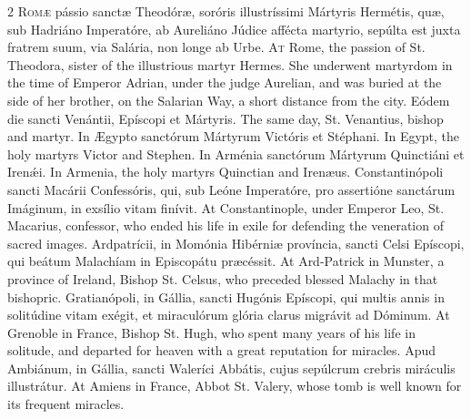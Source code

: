 \begin{paracol}{2}
\lettrine[lines=2]{R}{omæ} pássio sanctæ Theodóræ, soróris 
 illustríssimi Mártyris Hermétis, quæ, sub Hadriáno Imperatóre, ab Aureliáno 
 Júdice affécta martyrio, sepúlta est juxta fratrem suum, via Salária, non 
 longe ab Urbe.
\switchcolumn
{}
\lettrine[lines=2]{A}{t} Rome, the passion of St. Theodora, sister of the illustrious martyr 
 Hermes. She underwent martyrdom in the time of Emperor Adrian, under 
 the judge Aurelian, and was buried at the side of her brother, on the 
 Salarian Way, a short distance from the city.
\switchcolumn*
{}
Eódem die sancti Venántii, Epíscopi et Mártyris.
\switchcolumn
{}
The same day, St. Venantius, bishop and martyr.
\switchcolumn*
{}
In Ægypto sanctórum Mártyrum Victóris et 
 Stéphani.
\switchcolumn
{}
In Egypt, the holy martyrs Victor and Stephen.
\switchcolumn*
{}
In Arménia sanctórum Mártyrum Quinctiáni et Irenǽi.
\switchcolumn
{}
In Armenia, the holy martyrs Quinctian and Irenæus.
\switchcolumn*
{}
Constantinópoli sancti Macárii Confessóris, qui, sub Leóne Imperatóre, pro 
 assertióne sanctárum Imáginum, in exsílio vitam finívit.
\switchcolumn
{}
At Constantinople, under Emperor Leo, St. Macarius, confessor, who ended his 
 life in exile for defending the veneration of sacred images.
\switchcolumn*
{}
Ardpatrícii, in Momónia Hibérniæ província, 
 sancti Celsi Epíscopi, qui beátum Malachíam in Episcopátu præcéssit.
\switchcolumn
{}
At Ard-Patrick in Munster, a province of Ireland, Bishop St. Celsus, who 
 preceded blessed Malachy in that bishopric.
\switchcolumn*
{}
Gratianópoli, in Gállia, sancti Hugónis Epíscopi, qui multis annis in 
 solitúdine vitam exégit, et miraculórum glória clarus migrávit ad Dóminum.
\switchcolumn
{}
At Grenoble in France, Bishop St. Hugh, who spent many years of his life in 
 solitude, and departed for heaven with a great reputation for miracles.
\switchcolumn*
{}
Apud Ambiánum, in Gállia, sancti Waleríci 
 Abbátis, cujus sepúlcrum crebris miráculis illustrátur.
\switchcolumn
{}
At Amiens in France, Abbot St. Valery, whose tomb is well known for its 
 frequent miracles.
\switchcolumn*
{}
\end{paracol}

